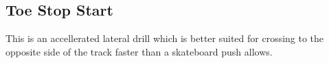 \subsection*{Toe Stop Start}

This is an accellerated lateral drill which is better suited for crossing to the opposite side of the track faster than a skateboard push allows.
